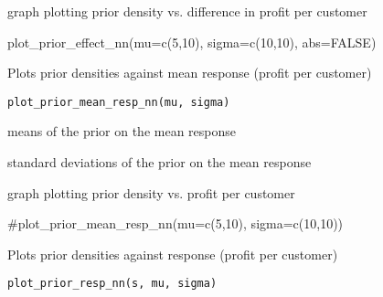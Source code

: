 \documentclass[a4paper]{book}
\begin{document}
%
\begin{Value}
graph plotting prior density vs. difference in profit per customer
\end{Value}
%
\begin{Examples}
\begin{ExampleCode}
plot_prior_effect_nn(mu=c(5,10), sigma=c(10,10), abs=FALSE)
\end{ExampleCode}
\end{Examples}
%
\begin{Description}\relax
Plots prior densities against mean response (profit per customer)
\end{Description}
%
\begin{Usage}
\begin{verbatim}
plot_prior_mean_resp_nn(mu, sigma)
\end{verbatim}
\end{Usage}
%
\begin{Arguments}
\begin{ldescription}
\item[\code{mu}] means of the prior on the mean response

\item[\code{sigma}] standard deviations of the prior on the mean response
\end{ldescription}
\end{Arguments}
%
\begin{Value}
graph plotting prior density vs. profit per customer
\end{Value}
%
\begin{Examples}
\begin{ExampleCode}
#plot_prior_mean_resp_nn(mu=c(5,10), sigma=c(10,10))
\end{ExampleCode}
\end{Examples}
%
\begin{Description}\relax
Plots prior densities against response (profit per customer)
\end{Description}
%
\begin{Usage}
\begin{verbatim}
plot_prior_resp_nn(s, mu, sigma)
\end{verbatim}
\end{Usage}
\end{document}
